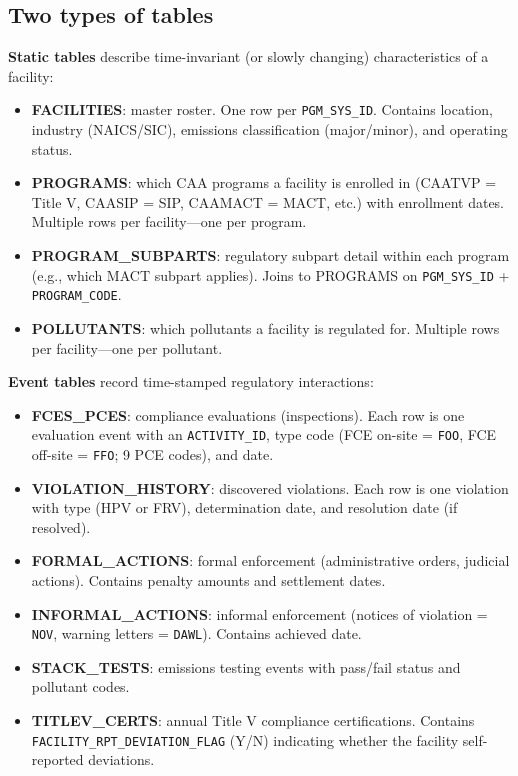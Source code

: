 \documentclass[11pt]{article}
\begin{document}
\subsection*{Two types of tables}

\textbf{Static tables} describe time-invariant (or slowly changing) characteristics of a facility:

\begin{itemize}[nosep]
  \item \textbf{FACILITIES}: master roster. One row per \texttt{PGM\_SYS\_ID}. Contains location, industry (NAICS/SIC), emissions classification (major/minor), and operating status.
  \item \textbf{PROGRAMS}: which CAA programs a facility is enrolled in (CAATVP = Title V, CAASIP = SIP, CAAMACT = MACT, etc.) with enrollment dates. Multiple rows per facility---one per program.
  \item \textbf{PROGRAM\_SUBPARTS}: regulatory subpart detail within each program (e.g., which MACT subpart applies). Joins to PROGRAMS on \texttt{PGM\_SYS\_ID} + \texttt{PROGRAM\_CODE}.
  \item \textbf{POLLUTANTS}: which pollutants a facility is regulated for. Multiple rows per facility---one per pollutant.
\end{itemize}

\textbf{Event tables} record time-stamped regulatory interactions:

\begin{itemize}[nosep]
  \item \textbf{FCES\_PCES}: compliance evaluations (inspections). Each row is one evaluation event with an \texttt{ACTIVITY\_ID}, type code (FCE on-site = \texttt{FOO}, FCE off-site = \texttt{FFO}; 9 PCE codes), and date.
  \item \textbf{VIOLATION\_HISTORY}: discovered violations. Each row is one violation with type (HPV or FRV), determination date, and resolution date (if resolved).
  \item \textbf{FORMAL\_ACTIONS}: formal enforcement (administrative orders, judicial actions). Contains penalty amounts and settlement dates.
  \item \textbf{INFORMAL\_ACTIONS}: informal enforcement (notices of violation = \texttt{NOV}, warning letters = \texttt{DAWL}). Contains achieved date.
  \item \textbf{STACK\_TESTS}: emissions testing events with pass/fail status and pollutant codes.
  \item \textbf{TITLEV\_CERTS}: annual Title V compliance certifications. Contains \texttt{FACILITY\_RPT\_DEVIATION\_FLAG} (Y/N) indicating whether the facility self-reported deviations.
\end{itemize}
\end{document}
